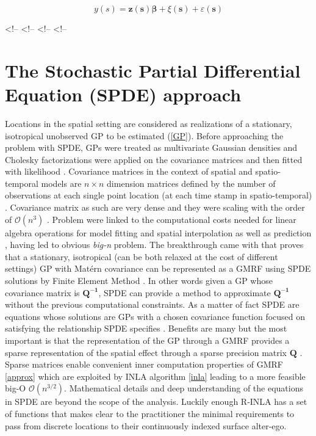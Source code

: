 \documentclass[
  12pt,
  a4paper,
  oneside]{book}
\theoremstyle{definition}
\theoremstyle{definition}
\theoremstyle{definition}
\theoremstyle{remark}
\begin{document}
\[
y(s)=\boldsymbol{z}(\boldsymbol{s}) \boldsymbol{\beta}+\xi(\boldsymbol{s})+\varepsilon(\boldsymbol{s})
\]

\textless!--
\textless!--
\textless!--
\textless!--

\hypertarget{spdeapproach}{%
\section{The Stochastic Partial Differential Equation (SPDE) approach}\label{spdeapproach}}

Locations in the spatial setting are considered as realizations of a stationary, isotropical unobserved GP to be estimated (\ref{GP}). Before approaching the problem with SPDE, GPs were treated as multivariate Gaussian densities and Cholesky factorizations were applied on the covariance matrices and then fitted with likelihood \citep{LecturePaci}. Covariance matrices in the context of spatial and spatio-temporal models \citep{PACI2017149, Cameletti2012} are \(n \times n\) dimension matrices defined by the number of observations at each single point location (at each time stamp in spatio-temporal) \citep{BLANGIARDO201339}. Covariance matrix as such are very dense and they were scaling with the order of \(\mathcal{O}\left(n^{3}\right)\) \citep{Banerjee-Gelfand}. Problem were linked to the computational costs needed for linear algebra operations for model fitting and spatial interpolation as well as prediction \citep{Cameletti2012}, having led to obvious \emph{big-n} problem.
The breakthrough came with \citet{Lindgren2011} that proves that a stationary, isotropical (can be both relaxed at the cost of different settings) GP with Matérn covariance can be represented as a GMRF using SPDE solutions by Finite Element Method \citep{Krainski-Rubio}. In other words given a GP whose covariance matrix is \(\boldsymbol{Q^{-1}}\), SPDE can provide a method to approximate \(\boldsymbol{Q^{-1}}\) without the previous computational constraints. As a matter of fact SPDE are equations whose solutions are GPs with a chosen covariance function focused on satisfying the relationship SPDE specifies \citeyearpar{Krainski-Rubio}.
Benefits are many but the most important is that the representation of the GP through a GMRF provides a sparse representation of the spatial effect through a sparse precision matrix \(\boldsymbol{Q}\) . Sparse matrices enable convenient inner computation properties of GMRF \ref{approx} which are exploited by INLA algorithm \ref{inla} leading to a more feasible big-O \(\mathcal{O}\left(n^{3 / 2}\right)\). Mathematical details and deep understanding of the equations in SPDE are beyond the scope of the analysis. Luckily enough R-INLA has a set of functions that makes clear to the practitioner the minimal requirements to pass from discrete locations to their continuously indexed surface alter-ego.
\end{document}
